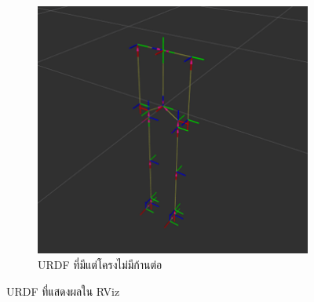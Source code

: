 \begin{figure}[!ht]
\begin{subfigure}[b]{0.5\textwidth}
        \includegraphics[width=\textwidth]{chapter4/images/urdf_rviz0.png}
        \caption{URDF ที่มีแต่โครงไม่มีก้านต่อ}
    \end{subfigure}
    \caption{URDF ที่แสดงผลใน RViz}
\end{figure}
